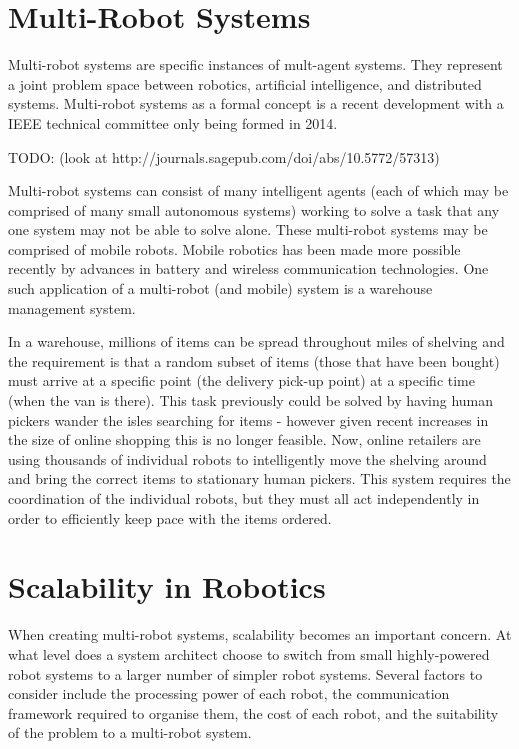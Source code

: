 \documentclass[../dissertation.tex]{subfiles}
\begin{document}
\section{Multi-Robot Systems}

Multi-robot systems are specific instances of mult-agent systems. They represent a joint problem space between robotics, artificial intelligence, and distributed systems. Multi-robot systems as a formal concept is a recent development with a IEEE technical committee only being formed in 2014\cite{MultiRobotSystemsIEEECommittee}.

TODO: (look at http://journals.sagepub.com/doi/abs/10.5772/57313)

Multi-robot systems can consist of many intelligent agents (each of which may be comprised of many small autonomous systems) working to solve a task that any one system may not be able to solve alone. These multi-robot systems may be comprised of mobile robots. Mobile robotics has been made more possible recently by advances in battery and wireless communication technologies. One such application of a multi-robot (and mobile) system is a warehouse management system.

In a warehouse, millions of items can be spread throughout miles of shelving and the requirement is that a random subset of items (those that have been bought) must arrive at a specific point (the delivery pick-up point) at a specific time (when the van is there). This task previously could be solved by having human pickers wander the isles searching for items - however given recent increases in the size of online shopping this is no longer feasible. Now, online retailers are using thousands of individual robots to intelligently move the shelving around and bring the correct items to stationary human pickers. This system requires the coordination of the individual robots, but they must all act independently in order to efficiently keep pace with the items ordered.

\section{Scalability in Robotics}

When creating multi-robot systems, scalability becomes an important concern. At what level does a system architect choose to switch from small highly-powered robot systems to a larger number of simpler robot systems. Several factors to consider include the processing power of each robot, the communication framework required to organise them, the cost of each robot, and the suitability of the problem to a multi-robot system.
\end{document}
